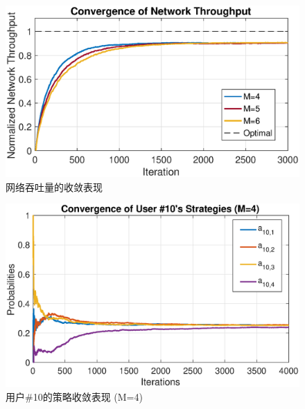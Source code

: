 \begin{figure}[!t]
		\centering
		\includegraphics[scale=0.65]{./pic/conv_ch3.eps}
		\caption{网络吞吐量的收敛表现}\label{fg:conv1}
\end{figure}
\begin{figure}[!t]
		\centering
		\includegraphics[scale=0.64]{./pic/str_conv4.eps}
		\caption{用户\#10的策略收敛表现 (M=4)}\label{fg:conv2}
\end{figure}



